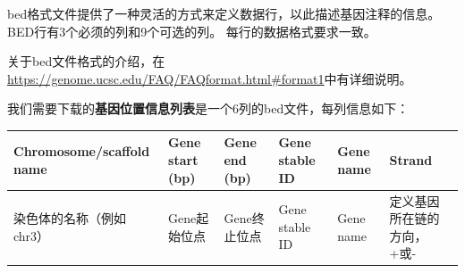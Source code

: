 \documentclass[]{article}
\numberwithin{figure}{section}
\numberwithin{table}{section}
\begin{document}
bed格式文件提供了一种灵活的方式来定义数据行，以此描述基因注释的信息。BED行有3个必须的列和9个可选的列。 每行的数据格式要求一致。

关于bed文件格式的介绍，在\url{https://genome.ucsc.edu/FAQ/FAQformat.html\#format1}中有详细说明。

我们需要下载的\textbf{基因位置信息列表}是一个6列的bed文件，每列信息如下：

\begin{longtable}[]{@{}llllll@{}}
\toprule
\begin{minipage}[b]{0.14\columnwidth}\raggedright
Chromosome/scaffold name\strut
\end{minipage} & \begin{minipage}[b]{0.14\columnwidth}\raggedright
Gene start (bp)\strut
\end{minipage} & \begin{minipage}[b]{0.14\columnwidth}\raggedright
Gene end (bp)\strut
\end{minipage} & \begin{minipage}[b]{0.14\columnwidth}\raggedright
Gene stable ID\strut
\end{minipage} & \begin{minipage}[b]{0.14\columnwidth}\raggedright
Gene name\strut
\end{minipage} & \begin{minipage}[b]{0.14\columnwidth}\raggedright
Strand\strut
\end{minipage}\tabularnewline
\midrule
\endhead
\begin{minipage}[t]{0.14\columnwidth}\raggedright
染色体的名称（例如chr3）\strut
\end{minipage} & \begin{minipage}[t]{0.14\columnwidth}\raggedright
Gene起始位点\strut
\end{minipage} & \begin{minipage}[t]{0.14\columnwidth}\raggedright
Gene终止位点\strut
\end{minipage} & \begin{minipage}[t]{0.14\columnwidth}\raggedright
Gene stable ID\strut
\end{minipage} & \begin{minipage}[t]{0.14\columnwidth}\raggedright
Gene name\strut
\end{minipage} & \begin{minipage}[t]{0.14\columnwidth}\raggedright
定义基因所在链的方向，+或-\strut
\end{minipage}\tabularnewline
\bottomrule
\end{longtable}
\end{document}
